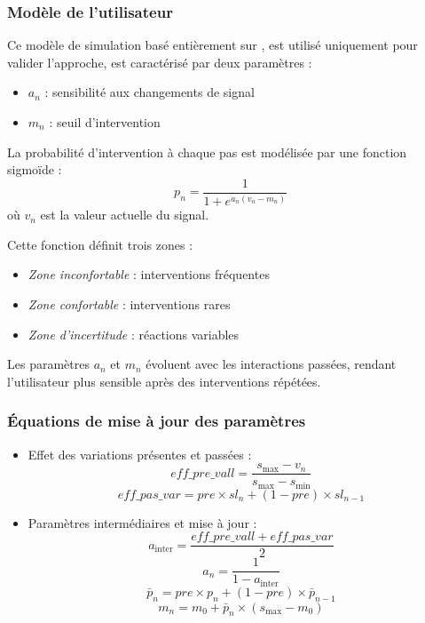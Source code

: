 \documentclass[a4paper,11pt]{article}
\begin{document}
\subsubsection{Modèle de l'utilisateur}

Ce modèle de simulation basé entièrement sur \cite{haddam2022}, est utilisé uniquement pour valider l'approche, est caractérisé par deux paramètres : 

\begin{itemize}
    \item $a_n$ : sensibilité aux changements de signal
    \item $m_n$ : seuil d'intervention
\end{itemize}

La probabilité d'intervention à chaque pas est modélisée par une fonction sigmoïde : 
$$p_n = \frac{1}{1+e^{a_n(v_n - m_n)}}$$
où $v_n$ est la valeur actuelle du signal.

Cette fonction définit trois zones : 
\begin{itemize}
    \item \textit{Zone inconfortable} : interventions fréquentes
    \item \textit{Zone confortable} : interventions rares
    \item \textit{Zone d'incertitude} : réactions variables
\end{itemize}

Les paramètres $a_n$ et $m_n$ évoluent avec les interactions passées, rendant l'utilisateur plus sensible après des interventions répétées.

\subsubsection{Équations de mise à jour des paramètres}

\begin{itemize}
    \item Effet des variations présentes et passées :
    $$eff\_pre\_vall = \frac{s_{\text{max}} - v_n}{s_{\text{max}} - s_{\text{min}}}$$
    $$eff\_pas\_var = pre \times sl_n + (1-pre) \times sl_{n-1}$$

    \item Paramètres intermédiaires et mise à jour :
    $$a_{\text{inter}} = \frac{eff\_pre\_vall + eff\_pas\_var}{2}$$
    $$a_n = \frac{1}{1-a_{\text{inter}}}$$
    $$\bar{p}_n = pre \times p_n + (1-pre) \times \bar{p}_{n-1}$$
    $$m_n = m_0 + \bar{p}_n \times (s_{\text{max}} - m_0)$$
\end{itemize}
\end{document}
